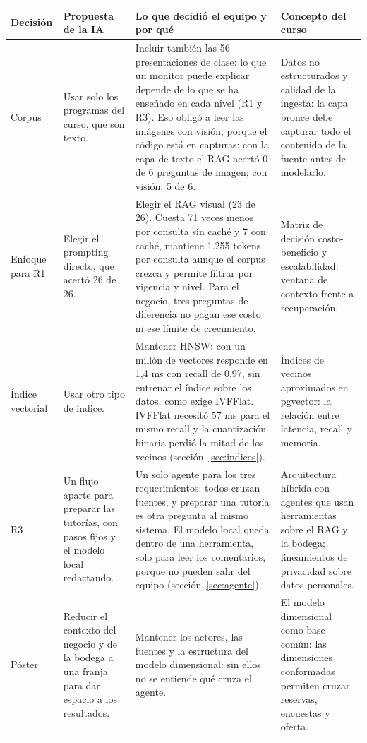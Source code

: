 \documentclass[11pt,letterpaper]{article}
\begin{document}
\begin{table}[H]\footnotesize\renewcommand{\arraystretch}{1.2}
\begin{tabularx}{\textwidth}{>{\raggedright\arraybackslash}p{}>{\raggedright\arraybackslash}p{}LL}
\toprule
\textbf{Decisión} & \textbf{Propuesta de la IA} & \textbf{Lo que decidió el equipo y por qué} & \textbf{Concepto del curso} \\
\midrule
Corpus & Usar solo los programas del curso, que son texto. & Incluir también las 56 presentaciones de clase: lo que un monitor puede explicar depende de lo que se ha enseñado en cada nivel (R1 y R3). Eso obligó a leer las imágenes con visión, porque el código está en capturas: con la capa de texto el RAG acertó 0 de 6 preguntas de imagen; con visión, 5 de 6. & Datos no estructurados y calidad de la ingesta: la capa bronce debe capturar todo el contenido de la fuente antes de modelarlo. \\
Enfoque para R1 & Elegir el prompting directo, que acertó 26 de 26. & Elegir el RAG visual (23 de 26). Cuesta 71 veces menos por consulta sin caché y 7 con caché, mantiene 1.255 tokens por consulta aunque el corpus crezca y permite filtrar por vigencia y nivel. Para el negocio, tres preguntas de diferencia no pagan ese costo ni ese límite de crecimiento. & Matriz de decisión costo-beneficio y escalabilidad: ventana de contexto frente a recuperación. \\
Índice vectorial & Usar otro tipo de índice. & Mantener HNSW: con un millón de vectores responde en 1,4 ms con recall de 0,97, sin entrenar el índice sobre los datos, como exige IVFFlat. IVFFlat necesitó 57 ms para el mismo recall y la cuantización binaria perdió la mitad de los vecinos (sección~\ref{sec:indices}). & Índices de vecinos aproximados en pgvector: la relación entre latencia, recall y memoria. \\
R3 & Un flujo aparte para preparar las tutorías, con pasos fijos y el modelo local redactando. & Un solo agente para los tres requerimientos: todos cruzan fuentes, y preparar una tutoría es otra pregunta al mismo sistema. El modelo local queda dentro de una herramienta, solo para leer los comentarios, porque no pueden salir del equipo (sección~\ref{sec:agente}). & Arquitectura híbrida con agentes que usan herramientas sobre el RAG y la bodega; lineamientos de privacidad sobre datos personales. \\
Póster & Reducir el contexto del negocio y de la bodega a una franja para dar espacio a los resultados. & Mantener los actores, las fuentes y la estructura del modelo dimensional: sin ellos no se entiende qué cruza el agente. & El modelo dimensional como base común: las dimensiones conformadas permiten cruzar reservas, encuestas y oferta. \\

\end{tabularx}
\end{table}
\end{document}
